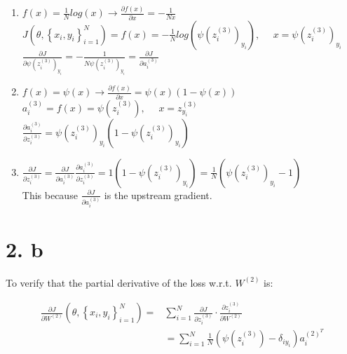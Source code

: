 \documentclass[
	12pt, %
]{fphw}
\begin{document}
\begin{enumerate}
\item $f(x) = \frac{1}{N} log(x) \rightarrow \frac{\partial f(x)}{\partial x} = -\frac{1}{Nx}$  \\ 

$J\left(\theta,\left\{x_{i}, y_{i}\right\}_{i=1}^{N}\right) = f(x) = - \frac {1}{N} log(\psi (z_{i}^{(3)})_{y_{i}}),\ \ \ \ \ \  x = \psi(z_{i}^{(3)})_{y_{i}} $ \\ 

$\frac{\partial J}{\partial \psi(z_{i}^{(3)})_{y_{i}}} = - \frac{1}{N \psi(z_{i}^{(3)})_{y_{i}}} = \frac{\partial J}{\partial a_{i}^{(3)}}$ \\


\item $f(x) = \psi(x) \rightarrow \frac{\partial f(x)}{\partial x} = \psi (x) (1 - \psi(x))$ \\

$ a_{i}^{(3)} = f(x) = \psi(z_{i}^{(3)}),\ \ \ \ \ \ x = z_{y_{i}}^{(3)}$ \\

$ \frac{\partial a_{i}^{(3)}}{\partial z_{i}^{(3)}} = \psi(z_{i}^{(3)})_{y_{i}} (1 - \psi(z_{i}^{(3)})_{y_{i}}) $ \\

\item $\frac{\partial J}{\partial z_{i}^{(3)}} = \frac{\partial J}{\partial a_{i}^{(3)}} \frac{\partial a_{i}^{(3)}}{\partial z_{i}^{(3)}} = 1 (1 - \psi(z_{i}^{(3)})_{y_{i}}) = \frac{1}{N} (\psi(z_{i}^{(3)})_{y_{i}} - 1)$ \\

This because $\frac{\partial J}{\partial a_{i}^{(3)}}$ is the upstream gradient.

\end{enumerate}

\newpage
\section* {2. b}



To verify that the partial derivative of the loss w.r.t. $W^{(2)}$ is:

$$
\begin{aligned}
\frac{\partial J}{\partial W^{(2)}}\left(\theta,\left\{x_{i}, y_{i}\right\}_{i=1}^{N}\right)=& \sum_{i=1}^{N} \frac{\partial J}{\partial z_{i}^{(3)}} \cdot \frac{\partial z_{i}^{(3)}}{\partial W^{(2)}} \\
&=\sum_{i=1}^{N} \frac{1}{N}\left(\psi\left(z_{i}^{(3)}\right)-\delta_{i y_{i}}\right) a_{i}^{(2)^{T}}
\end{aligned}
$$
\end{document}
